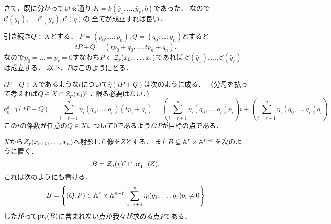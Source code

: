 \documentclass[a4paper]{jsarticle}
\newcommand{\cond}{\mathcal{C}}
\begin{document}
    さて，既に分かっている通り
    $K=k(\bar{y}_1,\dots,\bar{y}_r, \bar{\eta})$であった．
    なので$\cond(\bar{y}_1),\dots,\cond(\bar{y}_r), \cond(\bar{\eta})$の
    全てが成立すれば良い．

    引き続き$Q \in X$とする．
    $P=(p_0: \dots: p_n), Q=(q_0: \dots: q_n)$とすると
    \[ tP+Q=(tp_0+q_0, \dots, tp_n+q_n). \]
    なので$p_0=\dots=p_r=0$すなわち$P \in \mathcal{Z}_p(x_0,\dots,x_r)$であれば
    $\cond(\bar{y}_1),\dots,\cond(\bar{y}_r)$は成立する．
    以下，$P$はこのようにとる．

    $tP+Q \in X$であるような$t$について$\bar{\eta}(tP+Q)$は次のように成る．
    （分母を払って考えれば$Q \in X \cap \mathcal{Z}_p(x_0)^c$に限る必要はない．）
    \[
        q_0^d \cdot \eta(tP+Q)
        =\sum_{i=r+1}^{n} \eta_i(q_0,\dots,q_r) (tp_i+q_i)
        =\left( \sum_{i=r+1}^{n} \eta_i(q_0,\dots,q_r)p_i \right)t+\left( \sum_{i=r+1}^{n} \eta_i(q_0,\dots,q_r)q_i \right)
    \]
    この$t$の係数が任意の$Q \in X$について$0$であるような$P$が目標の点である．
    
    $X$から$\mathcal{Z}_p(x_{r+1},\dots,x_{n})$へ射影した像を$Z$とする．
    また$B \subseteq \mathbb{A}^{r} \times \mathbb{A}^{n-r}$を次のように置く．
    \[ B=\mathcal{Z}_a(\eta)^c \cap \operatorname{pr}_1^{-1}(Z). \]
    これは次のようにも書ける．
    \[ B=\left\{ (Q,P) \in \mathbb{A}^{r} \times \mathbb{A}^{n-r} \middle| \sum_{i=r+1}^{n} \eta_i(q_1,\dots,q_r)p_i \neq 0 \right\} \]
    したがって$\operatorname{pr}_2(B)$に含まれない点が我々が求める点$P$である．
\end{document}
